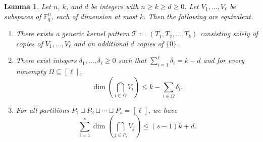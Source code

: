 \documentclass[11pt]{article}
\theoremstyle{plain}
\newtheorem{lemma}[thm]{Lemma}
\theoremstyle{definition}
\theoremstyle{remark}
\newcommand{\F}{\mathbb{F}}
\begin{document}
\begin{lemma}\label{order-l-cha}
Let $n$, $k$, and $d$ be integers with $n\ge k\geq d\geq 0$.
Let $V_1,\ldots,V_\ell$ be subspaces of $\F_q^n$, each of dimension at most $k$. Then the following are equivalent. 
\begin{enumerate}
\item\label{eqiv:1} There exists a generic kernel pattern $\mathcal{T}:=(T_1,T_2,\dots,T_k)$
consisting solely of copies of $V_1,\ldots,V_\ell$ and an additional $d$ copies of $\{0\}$.
\item\label{eqiv:2} There exist integers $\delta_1,\ldots,\delta_\ell\geq 0$ such that $\sum_{i=1}^{\ell}\delta_i=k-d$ and for every nonempty $\Omega\subseteq [\ell]$, 
\begin{equation}\label{eq:cond2}
\dim\left(\bigcap_{i\in \Omega}V_i\right)\leq k-\sum_{i\in \Omega}\delta_i.
\end{equation}
\item \label{eqiv:3} For all partitions $P_1\sqcup P_2\sqcup\cdots\sqcup P_s=[\ell]$, we have 
\begin{equation}\label{eq:cond3}
\sum_{i=1}^s\dim\left(\bigcap_{j\in P_i} V_j\right)\leq (s-1)k+d.
\end{equation}
\end{enumerate}
\end{lemma}
\end{document}
